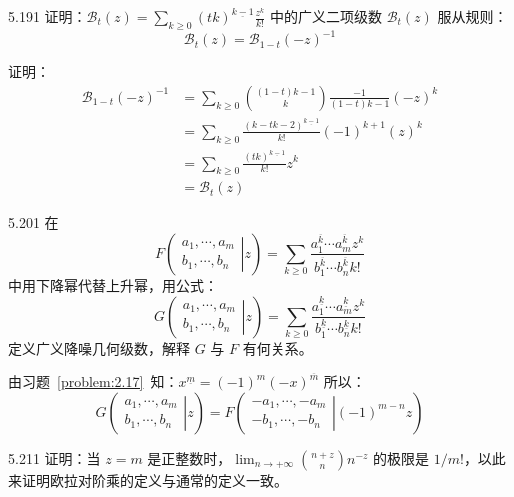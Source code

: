 \begin{problem}{5.19}{1}
  证明：\( \mathcal{B}_t (z) = \sum_{k \ge 0} (tk)^{\underline{k-1}} \frac{z^k}{k!} \) 中的广义二项级数 \( \mathcal{B}_t (z) \) 服从规则：
  \[
    \mathcal{B}_t (z) = \mathcal{B}_{1-t} (-z)^{-1}
  \]
\end{problem}

证明：
\begin{align*}
  \mathcal{B}_{1-t} (-z)^{-1} &= \sum_{k \ge 0} \binom{(1-t)k - 1}{k} \frac{-1}{(1-t)k - 1} (-z)^k \\
  &= \sum_{k \ge 0} \frac{(k-tk-2)^{\underline{k-1}}}{k!} (-1)^{k+1} (z)^k \\
  &= \sum_{k \ge 0} \frac{(tk)^{\underline{k-1}}}{k!} z^k \\
  &= \mathcal{B}_t (z)
\end{align*}

\begin{problem}{5.20}{1}
  在
  \[
    F
    \left( \left.
      \begin{array}{cccc}
        a_1, \cdots, a_m \\
        b_1, \cdots, b_n
    \end{array} \right|{z} \right) = \sum_{k \ge 0} \frac{a_1^{\overline{k}} \cdots a_m^{\overline{k}} z^k}{b_1^{\overline{k}} \cdots b_n^{\overline{k}} k!}
  \]
  中用下降幂代替上升幂，用公式：
  \[
    G
    \left( \left.
      \begin{array}{cccc}
        a_1, \cdots, a_m \\
        b_1, \cdots, b_n
    \end{array} \right|{z} \right) = \sum_{k \ge 0} \frac{a_1^{\underline{k}} \cdots a_m^{\underline{k}} z^k}{b_1^{\underline{k}} \cdots b_n^{\underline{k}} k!}
  \]
  定义广义降噪几何级数，解释 \( G \) 与 \( F \) 有何关系。
\end{problem}

由习题~\ref{problem:2.17}~知：\( x^{\underline{m}} = (-1)^m (-x)^{\overline{m}} \)
所以：
\[
  G
  \left( \left.
    \begin{array}{cccc}
      a_1, \cdots, a_m \\
      b_1, \cdots, b_n
  \end{array} \right|{z} \right)
  =
  F
  \left( \left.
    \begin{array}{cccc}
      -a_1, \cdots, -a_m \\
      -b_1, \cdots, -b_n
  \end{array} \right|{(-1)^{m-n} z} \right)
\]

\begin{problem}{5.21}{1}
  证明：当 \( z=m \) 是正整数时，\( \lim_{n \to + \infty} \binom{n+z}{n} n^{-z} \) 的极限是 \( 1/m! \)，以此来证明欧拉对阶乘的定义与通常的定义一致。
\end{problem}

